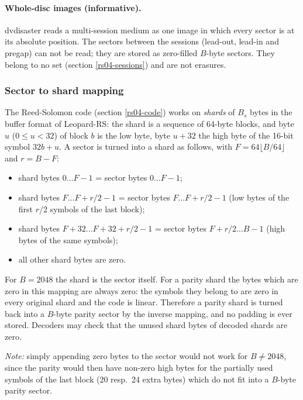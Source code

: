 \paragraph{Whole-disc images (informative).} dvdisaster reads a
multi-session medium as one image in which every sector is at its absolute
position. The sectors between the sessions (lead-out, lead-in and pregap) can
not be read; they are stored as zero-filled $B$-byte sectors. They belong to
no set (section \ref{rs04-sessions}) and are not erasures.

\subsubsection{Sector to shard mapping}
\label{rs04-shard}

The Reed-Solomon code (section \ref{rs04-code}) works on {\em shards} of
$B_s$ bytes in the buffer format of Leopard-RS: the shard is a sequence of
64-byte blocks, and byte $u$ ($0 \le u < 32$) of block $b$ is the low byte,
byte $u+32$ the high byte of the 16-bit symbol $32b+u$. A sector is turned
into a shard as follows, with $F = 64 \lfloor B/64 \rfloor$ and $r = B - F$:

\begin{itemize}
\item shard bytes $0 \ldots F-1$ = sector bytes $0 \ldots F-1$;
\item shard bytes $F \ldots F + r/2 - 1$ = sector bytes $F \ldots F + r/2 - 1$
  (low bytes of the first $r/2$ symbols of the last block);
\item shard bytes $F+32 \ldots F + 32 + r/2 - 1$ = sector bytes
  $F + r/2 \ldots B-1$ (high bytes of the same symbols);
\item all other shard bytes are zero.
\end{itemize}

For $B = 2048$ the shard is the sector itself. For a parity shard the bytes
which are zero in this mapping are always zero: the symbols they belong to
are zero in every original shard and the code is linear. Therefore a parity
shard is turned back into a $B$-byte parity sector by the inverse mapping,
and no padding is ever stored. Decoders may check that the unused shard
bytes of decoded shards are zero.

{\em Note:} simply appending zero bytes to the sector would not work for
$B \ne 2048$, since the parity would then have non-zero high bytes for the
partially used symbols of the last block (20 resp.\ 24 extra bytes) which do
not fit into a $B$-byte parity sector.


